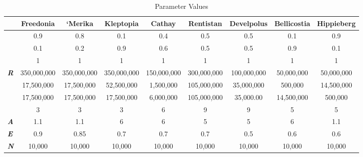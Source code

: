 \documentclass[12pt]{article}
\begin{document}
\begin{spacing}{1.5}

\begin{spacing}{1}
\begin{table}[]
\footnotesize

\begin{tabular}{lcccccccc}
\toprule
                    & \textbf{Freedonia} & \textbf{`Merika} & \textbf{Kleptopia} & \textbf{Cathay} & \textbf{Rentistan} & \textbf{Develpolus} & \textbf{Bellicostia} & \textbf{Hippieberg} \\ \hline
\boldmath{$\alpha$}   & 0.9              & 0.8              & 0.1                & 0.4             & 0.5                & 0.5                 & 0.1                  & 0.9                 \\
\boldmath{$\gamma$}   & 0.1                & 0.2              & 0.9                & 0.6             & 0.5                & 0.5                 & 0.9                  & 0.1                 \\
\boldmath{$\rho$} & 1 & 1 & 1 & 1 & 1 & 1 & 1 & 1 \\

\textit{\textbf{R}} & 350,000,000        & 350,000,000      & 350,000,000        & 150,000,000     & 300,000,000        & 100,000,000         & 50,000,000           & 50,000,000          \\
\boldmath{$\Phi$}     & 17,500,000         & 17,500,000       & 52,500,000         & 1,500,000       & 105,000,000        & 35,000,000          & 500,000              & 14,500,000          \\
\boldmath{$\Omega$}   & 17,500,000         & 17,500,000       & 17,500,000         & 6,000,000       & 105,000,000        & 35,000.00           & 14,500,000           & 500,000             \\
\boldmath{$\sigma$}   & 3                  & 3                & 3                  & 6               & 9                  & 9                   & 5                    & 5                   \\
\textit{\textbf{A}} & 1.1                & 1.1              & 6                  & 6               & 5                  & 5                   & 6                    & 1.1                 \\
\textit{\textbf{E}} & 0.9                & 0.85             & 0.7                & 0.7             & 0.7                & 0.5                 & 0.6                  & 0.6                 \\
\textit{\textbf{N}} & 10,000             & 10,000           & 10,000             & 10,000          & 10,000             & 10,000              & 10,000               & 10,000 \\ \hline            
\end{tabular}
\caption{Parameter Values}
\end{table}
\end{spacing}


\end{spacing}
\end{document}
